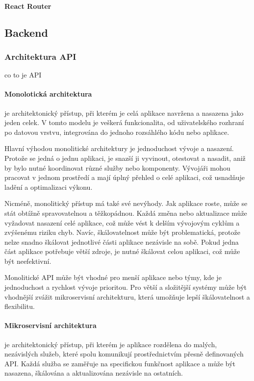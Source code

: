 \documentclass[12pt, a4paper]{article}
\begin{document}
\paragraph{React Router}

\subsection{Backend}
\subsubsection{Architektura API}
co to je API
\paragraph{Monolotická architektura}
je architektonický přístup, při kterém je celá aplikace navržena a nasazena jako jeden celek. V tomto modelu je veškerá funkcionalita, od uživatelského rozhraní po datovou vrstvu, integrována do jednoho rozsáhlého kódu nebo aplikace.

Hlavní výhodou monolitické architektury je jednoduchost vývoje a nasazení. Protože se jedná o jednu aplikaci, je snazší ji vyvinout, otestovat a nasadit, aniž by bylo nutné koordinovat různé služby nebo komponenty. Vývojáři mohou pracovat v jednom prostředí a mají úplný přehled o celé aplikaci, což usnadňuje ladění a optimalizaci výkonu.

Nicméně, monolitický přístup má také své nevýhody. Jak aplikace roste, může se stát obtížně spravovatelnou a těžkopádnou. Každá změna nebo aktualizace může vyžadovat nasazení celé aplikace, což může vést k delším vývojovým cyklům a zvýšenému riziku chyb. Navíc, škálovatelnost může být problematická, protože nelze snadno škálovat jednotlivé části aplikace nezávisle na sobě. Pokud jedna část aplikace potřebuje větší zdroje, je nutné škálovat celou aplikaci, což může být neefektivní.

Monolitické API může být vhodné pro menší aplikace nebo týmy, kde je jednoduchost a rychlost vývoje prioritou. Pro větší a složitější systémy může být vhodnější zvážit mikroservisní architekturu, která umožňuje lepší škálovatelnost a flexibilitu.
\paragraph{Mikroservisní architektura}
je architektonický přístup, při kterém je aplikace rozdělena do malých, nezávislých služeb, které spolu komunikují prostřednictvím přesně definovaných API. Každá služba se zaměřuje na specifickou funkčnost aplikace a může být nasazena, škálována a aktualizována nezávisle na ostatních.
\end{document}
